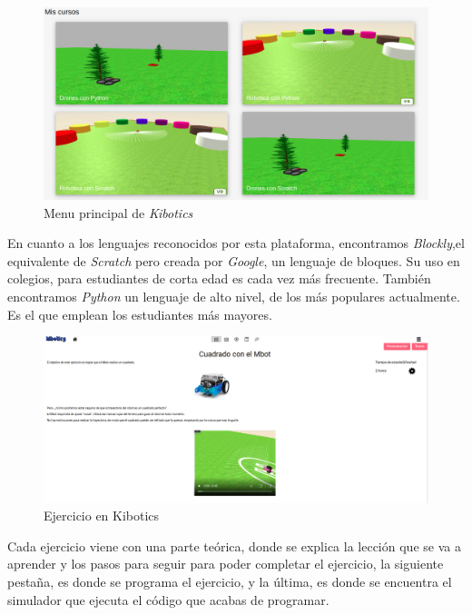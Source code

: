 \begin{figure}[h]
  \centering
    \includegraphics[width=1\textwidth]{img/kibotics2.png}
  \caption{Menu principal de \textit{Kibotics}}
  \label{Robot PiBot}
\end{figure}
En cuanto a los lenguajes reconocidos por esta plataforma, encontramos \textit{Blockly},el equivalente de \textit{Scratch} pero creada por \textit{Google}, un lenguaje de bloques. Su uso en colegios, para estudiantes de corta edad es cada vez más frecuente. También encontramos \textit{Python} un lenguaje de alto nivel, de los más populares actualmente. Es el que emplean los estudiantes más mayores. 
\begin{figure}[h]
  \centering
    \includegraphics[width=1\textwidth]{img/kibotics1.png}
  \caption{Ejercicio en Kibotics}
  \label{Ejercicio con Blockly en Kibotics}
\end{figure}

Cada ejercicio viene con una parte teórica, donde se explica la lección que se va a aprender y los pasos para seguir para poder completar el ejercicio, la siguiente pestaña, es donde se programa el ejercicio, y la última, es donde se encuentra el simulador que ejecuta el código que acabas de programar.





